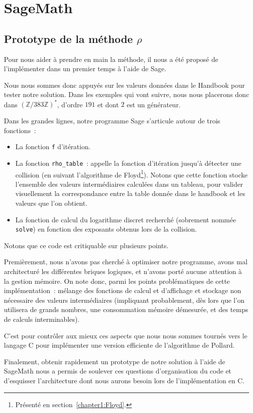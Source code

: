     \section{SageMath}
        \subsection{Prototype de la méthode \texorpdfstring{$\rho$}{Rho}}
        Pour nous aider à prendre en main la méthode, il nous a été proposé de l'implémenter dans un premier temps à l'aide de Sage.

        Nous nous sommes donc appuyés sur les valeurs données dans le Handbook pour tester notre solution.
        Dans les exemples qui vont suivre, nous nous placerons donc dans ${(\mathbb{Z}/383\mathbb{Z})}^*$, d'ordre $191$ et dont $2$ est un générateur.

        Dans les grandes lignes, notre programme Sage s'articule autour de trois fonctions~:
        \begin{itemize}
            \item La fonction \lstinline{f} d'itération.
            \item La fonction \lstinline{rho_table}~: appelle la fonction d'itération jusqu'à détecter une collision (en suivant l'algorithme de Floyd\footnote{Présenté en section~\ref{chapter1:Floyd}.}). Notons que cette fonction stocke l'ensemble des valeurs intermédiaires calculées dans un tableau, pour valider visuellement la correspondance entre la table donnée dans le handbook\autocite[107]{handbook} et les valeurs que l'on obtient.
            \item La fonction de calcul du logarithme discret recherché (sobrement nommée \lstinline{solve}) en fonction des exposants obtenus lors de la collision.
        \end{itemize}

        Notons que ce code est critiquable sur plusieurs points.

        Premièrement, nous n'avons pas cherché à optimiser notre programme, avons mal architecturé les différentes briques logiques, et n'avons porté aucune attention à la gestion mémoire.
        On note donc, parmi les points problématiques de cette implémentation~: mélange des fonctions de calcul et d'affichage et stockage non nécessaire des valeurs intermédiaires (impliquant probablement, dès lors que l'on utilisera de grands nombres, une consommation mémoire démesurée, et des temps de calculs interminables).

        C'est pour contrôler aux mieux ces aspects que nous nous sommes tournés vers le langage C pour implémenter une version efficiente de l'algorithme de Pollard.

        Finalement, obtenir rapidement un prototype de notre solution à l'aide de SageMath nous a permis de soulever ces questions d'organisation du code et d'esquisser l'architecture dont nous aurons besoin lors de l'implémentation en C.
